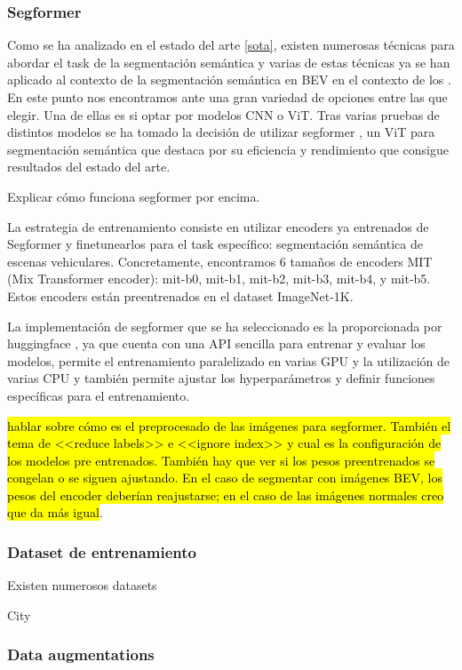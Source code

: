 \subsubsection{Segformer}
Como se ha analizado en el estado del arte \ref{sota}, existen numerosas técnicas para abordar el task de la segmentación semántica y varias de estas técnicas ya se han aplicado al contexto de la segmentación semántica en BEV en el contexto de los . En este punto nos encontramos ante una gran variedad de opciones entre las que elegir. Una de ellas es si optar por modelos CNN o ViT. Tras varias pruebas de distintos modelos \cite{dummy} \cite{dummy} \cite{dummy} se ha tomado la decisión de utilizar segformer \cite{segformer}, un ViT para segmentación semántica que destaca por su eficiencia y rendimiento que consigue resultados del estado del arte.

Explicar cómo funciona segformer por encima.

La estrategia de entrenamiento consiste en utilizar encoders ya entrenados de Segformer y finetunearlos para el task específico: segmentación semántica de escenas vehiculares. Concretamente, encontramos 6 tamaños de encoders MIT (Mix Transformer encoder): mit-b0, mit-b1, mit-b2, mit-b3, mit-b4, y mit-b5. Estos encoders están preentrenados en el dataset ImageNet-1K.

La implementación de segformer que se ha seleccionado es la proporcionada por huggingface \cite{huggingface}, ya que cuenta con una API sencilla para entrenar y evaluar los modelos, permite el entrenamiento paralelizado en varias GPU y la utilización de varias CPU y también permite ajustar los hyperparámetros y definir funciones específicas para el entrenamiento.

\hl{hablar sobre cómo es el preprocesado de las imágenes para segformer. También el tema de <<reduce labels>> e <<ignore index>> y cual es la configuración de los modelos pre entrenados. También hay que ver si los pesos preentrenados se congelan o se siguen ajustando. En el caso de segmentar con imágenes BEV, los pesos del encoder deberían reajustarse; en el caso de las imágenes normales creo que da más igual}.

\subsubsection{Dataset de entrenamiento}
Existen numerosos datasets 

City

\subsubsection{Data augmentations}
